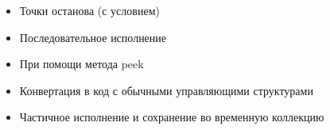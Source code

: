 \begin{frame}
\frametitle{\insertsection} 
\framesubtitle{\insertsubsection}
\begin{itemize}
	\item Точки останова (с условием)
	\item Последовательное исполнение
	\item При помощи метода peek
	\item Конвертация в код с обычными управляющими структурами
	\item Частичное исполнение и сохранение во временную коллекцию
\end{itemize}
\end{frame}
